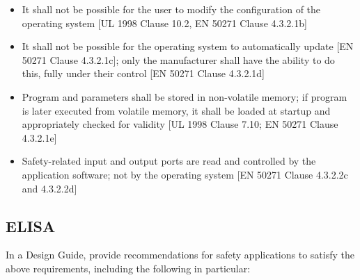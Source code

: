 \documentclass[12pt]{../Common_files/ElisaPaper}
\begin{document}
\begin{itemize}
\begin{itemize}
\end{itemize}

\item It shall not be possible for the user to modify the configuration of the operating system [UL 1998 \cite{UL1998} Clause 10.2, EN 50271 \cite{EN50271} Clause 4.3.2.1b]

\item It shall not be possible for the operating system to automatically update [EN 50271 \cite{EN50271} Clause 4.3.2.1c]; only the manufacturer shall have the ability to do this, fully under their control  [EN 50271 \cite{EN50271} Clause 4.3.2.1d]

\item Program and parameters shall be stored in non-volatile memory; if program is later executed from volatile memory, it shall be loaded at startup and appropriately checked for validity [UL 1998 \cite{UL1998} Clause 7.10; EN 50271 \cite{EN50271} Clause 4.3.2.1e]

\item Safety-related input and output ports are read and controlled by the application software; not by the operating system  [EN 50271 \cite{EN50271} Clause 4.3.2.2c and 4.3.2.2d]

\end{itemize}

\subsection{ELISA}
In a Design Guide, provide recommendations for safety applications to satisfy the above requirements, including the following in particular:
\end{document}
